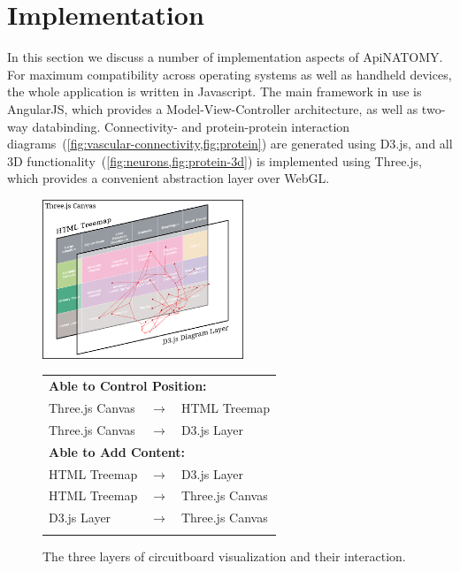 \section{Implementation} \label{sect:implementation}                                     %

In this section we discuss a number of implementation aspects of \mbox{ApiNATOMY}.
For maximum compatibility across operating systems as well as handheld devices,
the whole application is written in Javascript. The main framework in use is
AngularJS, which provides a Model-View-Controller architecture, as well as
two-way databinding. Connectivity- and protein-protein
interaction diagrams~(\cref{fig:vascular-connectivity,fig:protein})
are generated using D3.js, and all 3D functionality~(\cref{fig:neurons,fig:protein-3d})
is implemented using Three.js, which provides a convenient abstraction layer over WebGL.

\begin{figure}[ht]
	\centering
	\includegraphics[width=6cm]{images/visual-layers.png}
	\hskip1mm
	\begin{tabular}[b]{lcl}
		\multicolumn{3}{l}{\textbf{Able to Control Position:}}     \\[1mm]
		Three.js Canvas     & $\longrightarrow$ & HTML Treemap     \\[1mm]
		Three.js Canvas     & $\longrightarrow$ & D3.js Layer      \\[3mm]
		
		\multicolumn{3}{l}{\textbf{Able to Add Content:}}          \\[1mm]
		HTML Treemap        & $\longrightarrow$ & D3.js Layer      \\[1mm]
		HTML Treemap        & $\longrightarrow$ & Three.js Canvas  \\[1mm]
		D3.js Layer         & $\longrightarrow$ & Three.js Canvas  \\[3mm]\vphantom{x}%
	\end{tabular}
	\vskip1mm
	\caption{The three layers of circuitboard visualization and their interaction.}
	\label{fig:visual-layers}
\end{figure}


